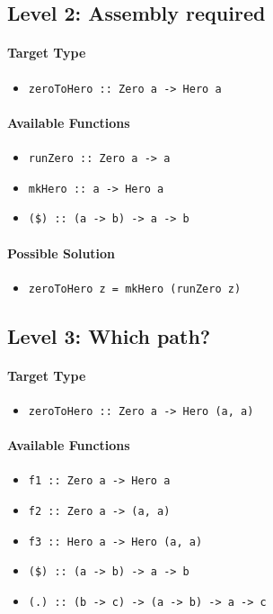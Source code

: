 \documentclass[preprint,12pt]{elsarticle}
\begin{document}
\subsection{Level 2: Assembly required}

\paragraph{Target Type} 
\begin{itemize}
    \item \texttt{zeroToHero :: Zero a -> Hero a}
\end{itemize}

\paragraph{Available Functions} 
\begin{itemize}
    \item \texttt{runZero :: Zero a -> a}
    \item \texttt{mkHero :: a -> Hero a}
    \item \texttt{(\$) :: (a -> b) -> a -> b}
\end{itemize}

\paragraph{Possible Solution} 
\begin{itemize}
    \item \texttt{zeroToHero z = mkHero (runZero z)}
\end{itemize}

\subsection{Level 3: Which path?}
\paragraph{Target Type } 
\begin{itemize}
    \item \texttt{zeroToHero :: Zero a -> Hero (a, a)}
\end{itemize}

\paragraph{Available Functions} 
\begin{itemize}
    \item \texttt{f1 :: Zero a -> Hero a}
    \item \texttt{f2 :: Zero a -> (a, a)}
    \item \texttt{f3 :: Hero a -> Hero (a, a)}
    \item \texttt{(\$) :: (a -> b) -> a -> b}
    \item \texttt{(.) :: (b -> c) -> (a -> b) -> a -> c}
\end{itemize}
\end{document}

